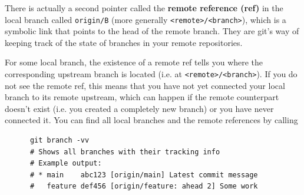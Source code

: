 \documentclass{article}
\begin{document}
    \begin{definition} 
      There is actually a second pointer called the \textbf{remote reference (ref)} in the local branch called \texttt{origin/B} (more generally \texttt{<remote>/<branch>}), which is a symbolic link that points to the head of the remote branch. They are git's way of keeping track of the state of branches in your remote repositories. 
    \end{definition} 

    For some local branch, the existence of a remote ref tells you where the corresponding upstream branch is located (i.e. at \texttt{<remote>/<branch>}). If you do not see the remote ref, this means that you have not yet connected your local branch to its remote upstream, which can happen if the remote counterpart doesn't exist (i.e. you created a completely new branch) or you have never connected it. You can find all local branches and the remote references by calling 
    \begin{lstlisting}
      git branch -vv
      # Shows all branches with their tracking info
      # Example output:
      # * main    abc123 [origin/main] Latest commit message
      #   feature def456 [origin/feature: ahead 2] Some work
    \end{lstlisting} 
\end{document}
